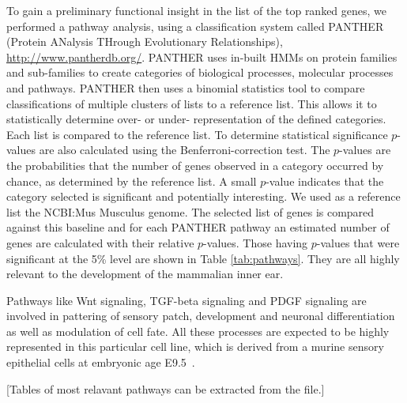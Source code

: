 \documentclass{article}
\begin{document}
To gain a preliminary functional insight in the list of the top ranked genes, we performed a pathway  analysis, using a classification system called
PANTHER   (Protein  ANalysis   THrough   Evolutionary  Relationships),
\url{http://www.pantherdb.org/}.  PANTHER uses in-built HMMs on protein families and sub-families to create categories of biological processes, molecular processes and pathways. PANTHER then uses a binomial statistics tool to compare classifications of multiple clusters of lists to a reference list. This allows it to statistically determine over- or under- representation of the defined categories. Each list is compared to the reference list. To determine statistical significance $p$-values are also calculated using the Benferroni-correction test. The $p$-values are the probabilities that the number of genes observed in a category occurred by chance, as determined by the reference list. A small $p$-value indicates that the category selected is significant and potentially interesting.  We used as a reference list the NCBI:Mus Musculus genome. The selected list of genes is compared against this baseline and for each PANTHER pathway an estimated number of genes are calculated with their relative $p$-values. Those  having  $p$-values  that  were
significant    at    the    5\%    level   are    shown    in    Table
\ref{tab:pathways}. They are all highly relevant to the development of
the mammalian inner ear.

Pathways like Wnt signaling, TGF-beta signaling and PDGF signaling are
involved  in  pattering of  sensory  patch,  development and  neuronal
differentiation  as  well  as  modulation  of  cell  fate.  All  these
processes  are expected to  be highly  represented in  this particular
cell line, which is derived  from a murine sensory epithelial cells at
embryonic age E9.5~\cite{Milo2009}.

[Tables of most relavant pathways can be extracted from the file.]
\end{document}
